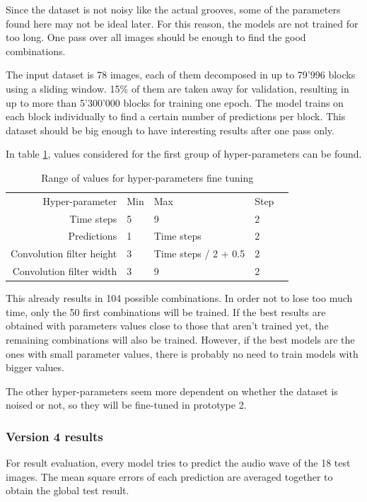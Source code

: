 \documentclass[12pt, twoside]{article}
\begin{document}
Since the dataset is not noisy like the actual grooves, some of the parameters found here may not be ideal later. For this reason, the models are not trained for too long. One pass over all images should be enough to find the good combinations.

The input dataset is 78 images, each of them decomposed in up to 79'996 blocks using a sliding window. 15\% of them are taken away for validation, resulting in up to more than 5'300'000 blocks for training one epoch. The model trains on each block individually to find a certain number of predictions per block. This dataset should be big enough to have interesting results after one pass only.

In table \ref{hp1}, values considered for the first group of hyper-parameters can be found.
\begin{table}[H]
	\begin{tabular}{|r|l|l|l|l}
		\cline{1-4}
		Hyper-parameter				& Min	& Max 					& Step 	& \\ \cline{1-4}
		Time steps  				& 5    	& 9   					& 2    	& \\ \cline{1-4}
		Predictions 				& 1    	& Time steps  			& 2 	& \\ \cline{1-4}
		Convolution filter height  	& 3 	& Time steps / 2 + 0.5 	& 2 	& \\ \cline{1-4}
		Convolution filter width  	& 3 	& 9 					& 2 	& \\ \cline{1-4}
		
	\end{tabular}
	\caption{Range of values for hyper-parameters fine tuning}
	\label{hp1}
\end{table}

This already results in 104 possible combinations. In order not to lose too much time, only the 50 first combinations will be trained. If the best results are obtained with parameters values close to those that aren't trained yet, the remaining combinations will also be trained. However, if the best models are the ones with small parameter values, there is probably no need to train models with bigger values.

The other hyper-parameters seem more dependent on whether the dataset is noised or not, so they will be fine-tuned in prototype 2. 
\subsubsection{Version 4 results}
For result evaluation, every model tries to predict the audio wave of the 18 test images. The mean square errors of each prediction are averaged together to obtain the global test result.
\end{document}
